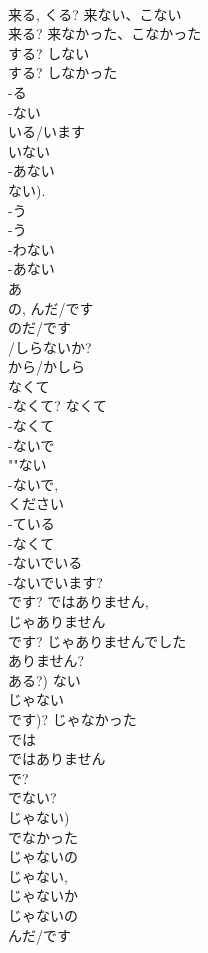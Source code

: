 \documentclass[8pt]{extreport}
\begin{document}
\begin{CJK}{UTF8}{min}
\\	来る, くる?	来ない、こない	
\\	来る?	来なかった、こなかった	
\\	する?	しない	
\\	する?	しなかった	
\\	-る 
\\	-ない	
\\	いる/います 
\\	いない	
\\	-あない 
\\	ない).	
\\	-う 
\\	-う 
\\	-わない 
\\	-あない 
\\	あ 
\\	の, んだ/です 
\\	のだ/です	
\\	/しらないか?
\\	から/かしら 
\\	なくて 
\\	-なくて?	なくて
\\	-なくて 
\\	-ないで 
\\	""ない
\\	-ないで, 
\\	ください 
\\	-ている 
\\	-なくて 
\\	-ないでいる 
\\	-ないでいます?	
\\	です?	ではありません, 
\\	じゃありません	
\\	です?	じゃありませんでした	
\\	ありません? 
\\	ある?)	ない		
\\	じゃない 
\\	です)?	じゃなかった		
\\	では 
\\	ではありません 
\\	で?		
\\	でない? 
\\	じゃない)	
\\	でなかった 
\\	じゃないの 
\\	じゃない, 
\\	じゃないか 
\\	じゃないの 
\\	んだ/です 

\end{CJK}
\end{document}
